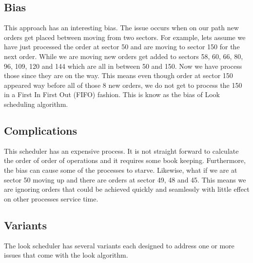 \documentclass[journal,10pt,onecolumn,compsoc,letterpaper,draftclsnofoot,table,xcdraw]{IEEEtran} \usepackage[margin=0.75in]{geometry}
\begin{document}
\subsection{Bias}
\noindent This approach has an interesting bias. The issue occurs when on our path new orders get placed between moving from two sectors. For example, lets assume we have just processed the order at sector 50 and are moving to sector 150 for the next order. While we are moving new orders get added to sectors 58, 60, 66, 80, 96, 109, 120 and 144 which are all in between 50 and 150. Now we have process those since they are on the way. This means even though order at sector 150 appeared way before all of those 8 new orders, we do not get to process the 150 in a First In First Out (FIFO) fashion. This is know as the bias of Look scheduling algorithm.
\subsection{Complications}
\noindent This scheduler has an expensive process. It is not straight forward to calculate the order of order of operations and it requires some book keeping. Furthermore, the bias can cause some of the processes to starve. Likewise, what if we are at sector 50 moving up and there are orders at sector 49, 48 and 45. This means we are ignoring orders that could be achieved quickly and seamlessly with little effect on other processes service time.
\subsection{Variants}
\noindent The look scheduler has several variants each designed to address one or more issues that come with the look algorithm.
\end{document}
